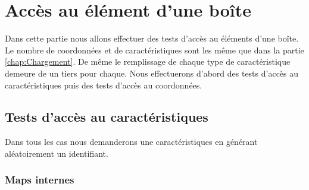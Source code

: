 \chapter{Accès au élément d'une boîte}
Dans cette partie nous allons effectuer des tests d'accès au éléments d'une boîte. Le nombre de coordonnées et de caractéristiques sont les même que dans la partie \ref{chap:Chargement}. De même le remplissage de chaque type de caractéristique demeure de un tiers pour chaque. Nous effectuerons d'abord des tests d'accès au caractéristiques puis des tests d'accès au coordonnées.

\section{Tests d'accès au caractéristiques}
Dans tous les cas nous demanderons une caractéristiques en générant aléatoirement un identifiant.

\subsection{Maps internes}


